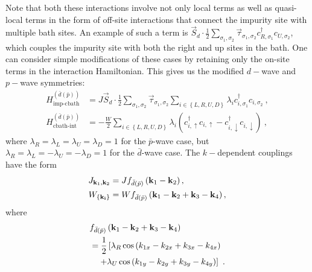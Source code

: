 \documentclass[reprint,hidelinks]{revtex4-2}
\begin{document}
Note that both these interactions involve not only local terms as well as quasi-local terms in the form of off-site interactions that connect the impurity site with multiple bath sites. An example of such a term is \(\vec{S}_d\cdot\frac{1}{2}\sum_{\sigma_1,\sigma_2}\vec{\tau}_{\sigma_1,\sigma_2} c^\dagger_{R,\sigma_1}c_{U,\sigma_2}\), which couples the impurity site with both the right and up sites in the bath. One can consider simple modifications of these cases by retaining only the on-site terms in the interaction Hamiltonian. This gives us the modified \(d-\)wave and \(p-\)wave symmetries:
\begin{equation}\begin{aligned}
	H^{(\bar d(\bar p))}_\text{imp-cbath} &= J\vec{S}_d\cdot\frac{1}{2}\sum_{\sigma_1,\sigma_2}\vec{\tau}_{\sigma_1,\sigma_2} \sum_{i \in \left\{L,R,U,D\right\}} \lambda_i c^\dagger_{i,\sigma_1}c_{i,\sigma_2}~,\\
	H^{(\bar d(\bar p))}_\text{cbath-int} &= -\frac{W}{2}\sum_{i \in \left\{L,R,U,D\right\}} \lambda_i \left(c^\dagger_{i, \uparrow}c_{i, \uparrow} - c^\dagger_{i, \downarrow}c_{i, \downarrow}\right) ~,
\end{aligned}\end{equation}
where \(\lambda_R = \lambda_L = \lambda_U = \lambda_D = 1\) for the \(\bar p\)-wave case, but \(\lambda_R = \lambda_L = -\lambda_U = -\lambda_D = 1\) for the \(\bar d\)-wave case. The \(k-\)dependent couplings have the form
\begin{equation}\begin{aligned}
	J_{{\bf k}_1, {\bf k}_2} &= J f_{\bar d(\bar p)}\left({\bf k}_1 -{\bf k}_2\right),\\
	W_{\left\{ \bf k_i \right\} } &= Wf_{\bar d(\bar p)}\left({\bf k}_1 -{\bf k}_2 + {\bf k}_3 -{\bf k}_4\right) ,
\end{aligned}\end{equation}
where 
\begin{equation}\begin{aligned}
	&f_{\bar d(\bar p)}\left({\bf k}_1 -{\bf k}_2 + {\bf k}_3 -{\bf k}_4\right) \\
	&= \frac{1}{2}\left[\lambda_R \cos\left(k_{1x} - k_{2x} + k_{3x} - k_{4x}\right) \right.\\
	&\quad\left. + \lambda_U \cos\left(k_{1y} - k_{2y} + k_{3y} - k_{4y}\right)\right] ~.
\end{aligned}\end{equation}
\end{document}
